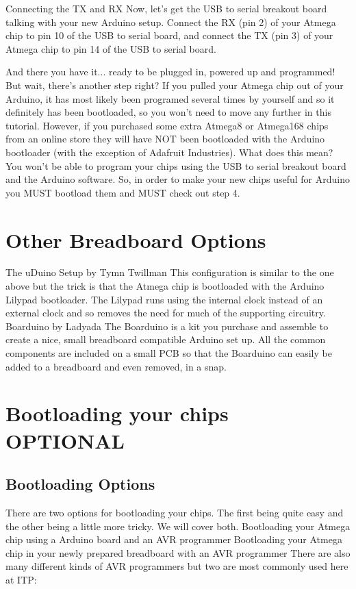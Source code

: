 Connecting the TX and RX
Now, let's get the USB to serial breakout board talking with your new Arduino setup. Connect the RX (pin 2) of your Atmega chip to pin 10 of the USB to serial board, and connect the TX (pin 3) of your Atmega chip to pin 14 of the USB to serial board.

And there you have it... ready to be plugged in, powered up and programmed!
But wait, there's another step right? If you pulled your Atmega chip out of your Arduino, it has most likely been programed several times by yourself and so it definitely has been bootloaded, so you won't need to move any further in this tutorial.
However, if you purchased some extra Atmega8 or Atmega168 chips from an online store they will have NOT been bootloaded with the Arduino bootloader (with the exception of Adafruit Industries). What does this mean? You won't be able to program your chips using the USB to serial breakout board and the Arduino software. So, in order to make your new chips useful for Arduino you MUST bootload them and MUST check out step 4.

\section{Other Breadboard Options}

The uDuino Setup by Tymn Twillman
This configuration is similar to the one above but the trick is that the Atmega chip is bootloaded with the Arduino Lilypad bootloader. The Lilypad runs using the internal clock instead of an external clock and so removes the need for much of the supporting circuitry.
Boarduino by Ladyada
The Boarduino is a kit you purchase and assemble to create a nice, small breadboard compatible Arduino set up. All the common components are included on a small PCB so that the Boarduino can easily be added to a breadboard and even removed, in a snap.

\section{Bootloading your chips OPTIONAL}

\subsection{Bootloading Options}

There are two options for bootloading your chips. The first being quite easy and the other being a little more tricky. We will cover both.
Bootloading your Atmega chip using a Arduino board and an AVR programmer
Bootloading your Atmega chip in your newly prepared breadboard with an AVR programmer
There are also many different kinds of AVR programmers but two are most commonly used here at ITP:

